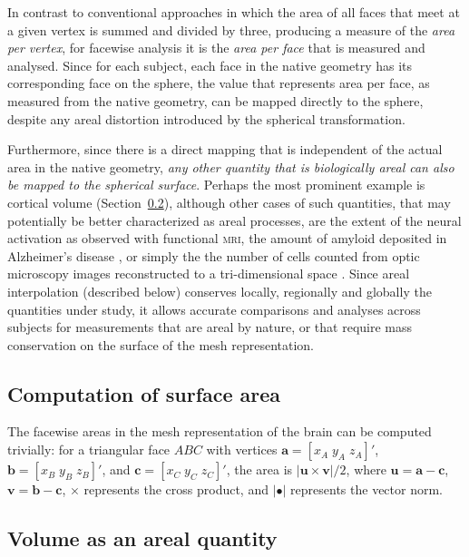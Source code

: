 In contrast to conventional approaches in which the area of all faces that meet at a given vertex is summed and divided by three, producing a measure of the \emph{area per vertex}, for facewise analysis it is the \emph{area per face} that is measured and analysed. Since for each subject, each face in the native geometry has its corresponding face on the sphere, the value that represents area per face, as measured from the native geometry, can be mapped directly to the sphere, despite any areal distortion introduced by the spherical transformation.

Furthermore, since there is a direct mapping that is independent of the actual area in the native geometry, \emph{any other quantity that is biologically areal can also be mapped to the spherical surface}. Perhaps the most prominent example is cortical volume (Section~\ref{sec:areal:volumes}), although other cases of such quantities, that may potentially be better characterized as areal processes, are the extent of the neural activation as observed with functional \textsc{mri}, the amount of amyloid deposited in Alzheimer's disease \citep{Klunk2004, Clark2011}, or simply the the number of cells counted from optic microscopy images reconstructed to a tri-dimensional space \citep{Schormann1998}. Since areal interpolation (described below) conserves locally, regionally and globally the quantities under study, it allows accurate comparisons and analyses across subjects for measurements that are areal by nature, or that require mass conservation on the surface of the mesh representation.

\subsection{Computation of surface area}

The facewise areas in the mesh representation of the brain can be computed trivially: for a triangular face $ABC$ with vertices $\mathbf{a}=[x_A \; y_A \; z_A]'$, $\mathbf{b}=[x_B \; y_B \; z_B]'$, and $\mathbf{c}=[x_C \; y_C \; z_C]'$, the area is $|\mathbf{u} \times \mathbf{v}|/2$, where $\mathbf{u} = \mathbf{a}-\mathbf{c}$, $\mathbf{v} = \mathbf{b}-\mathbf{c}$, $\times$ represents the cross product, and $|\bullet|$ represents the vector norm.

\subsection{Volume as an areal quantity}
\label{sec:areal:volumes}

